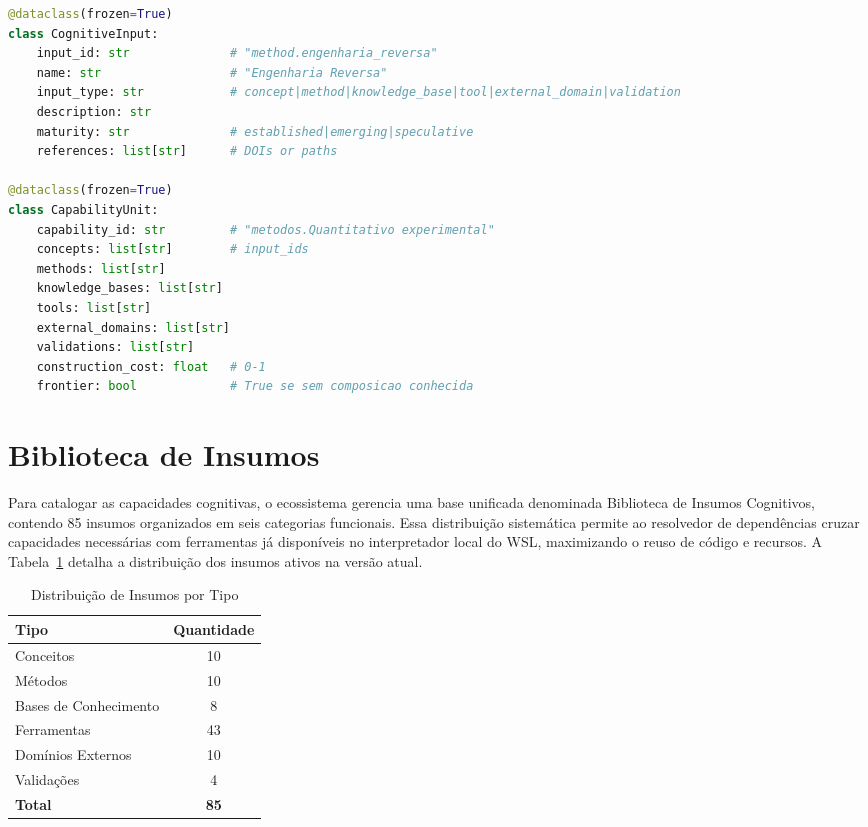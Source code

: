 \documentclass[12pt,a4paper,oneside]{abntex2}
\begin{document}
\begin{lstlisting}[language=Python, caption={Estrutura de CognitiveInput e CapabilityUnit}]
@dataclass(frozen=True)
class CognitiveInput:
    input_id: str              # "method.engenharia_reversa"
    name: str                  # "Engenharia Reversa"
    input_type: str            # concept|method|knowledge_base|tool|external_domain|validation
    description: str
    maturity: str              # established|emerging|speculative
    references: list[str]      # DOIs or paths

@dataclass(frozen=True)
class CapabilityUnit:
    capability_id: str         # "metodos.Quantitativo experimental"
    concepts: list[str]        # input_ids
    methods: list[str]
    knowledge_bases: list[str]
    tools: list[str]
    external_domains: list[str]
    validations: list[str]
    construction_cost: float   # 0-1
    frontier: bool             # True se sem composicao conhecida
\end{lstlisting}

\section{Biblioteca de Insumos}

Para catalogar as capacidades cognitivas, o ecossistema gerencia uma base unificada denominada Biblioteca de Insumos Cognitivos, contendo 85 insumos organizados em seis categorias funcionais. Essa distribuição sistemática permite ao resolvedor de dependências cruzar capacidades necessárias com ferramentas já disponíveis no interpretador local do WSL, maximizando o reuso de código e recursos. A Tabela~\ref{tab:insumos} detalha a distribuição dos insumos ativos na versão atual.

\begin{table}[H]
\centering
\caption{Distribuição de Insumos por Tipo}
\label{tab:insumos}
\begin{tabular}{lc}
\toprule
\textbf{Tipo} & \textbf{Quantidade} \\
\midrule
Conceitos & 10 \\
Métodos & 10 \\
Bases de Conhecimento & 8 \\
Ferramentas & 43 \\
Domínios Externos & 10 \\
Validações & 4 \\
\midrule
\textbf{Total} & \textbf{85} \\
\bottomrule
\end{tabular}
\end{table}
\end{document}
